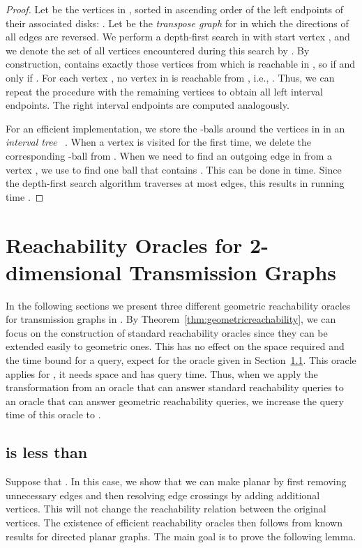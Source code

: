 \documentclass[11pt,a4paper]{paper}
\begin{document}
\begin{proof}
Let  be the vertices in ,
sorted in ascending order of the left endpoints of
their associated disks: .
Let  be the \emph{transpose graph} for  in which the 
directions of all edges are reversed. We perform a
depth-first search in  with start vertex , and 
we denote the set of all vertices
encountered during this search by . 
By construction,  contains exactly those vertices from which
 is reachable in , so
 if and only if .
For each vertex , 
no vertex in  is reachable from , i.e., 
.
Thus, we can repeat the procedure with the remaining
vertices to obtain all left interval endpoints.
The right interval endpoints are computed analogously.

For an efficient implementation, we store 
the -balls around the vertices in  in an 
\emph{interval tree} ~\cite{4M}. When a vertex  is visited
for the first time, we delete the corresponding -ball from
. When we need to find an outgoing edge in  from
a vertex , we 
use  to find one ball that contains . This
can be done in  time. Since the depth-first search
algorithm traverses at most  edges, this results in running
time .
\end{proof}


\section{Reachability Oracles for 2-dimensional Transmission Graphs}
\label{sec:2d}
In the following sections we present three different geometric reachability
oracles for
transmission graphs in . By Theorem~\ref{thm:geometricreachability}, we
can focus on the construction of standard reachability oracles since they can
be extended easily to geometric ones. This has no effect on the space required and the time bound for a
query, expect for the oracle given
in Section~\ref{sec:psisqrt3}. This oracle  applies for , it needs   space and has  query time.
Thus, when we apply the transformation from an oracle that can answer standard reachability queries to
an oracle that can answer geometric reachability queries, we increase the query time of this oracle to .

\subsection{ is
less than }
\label{sec:psisqrt3}
Suppose that . In this case, we show that
we can make  planar by
first removing unnecessary edges and then resolving edge crossings
by adding  additional vertices.
This will not change the reachability relation between
the original vertices. The existence of efficient reachability
oracles then follows from known results for directed planar graphs.
The main goal is to prove the following lemma.
\end{document}
